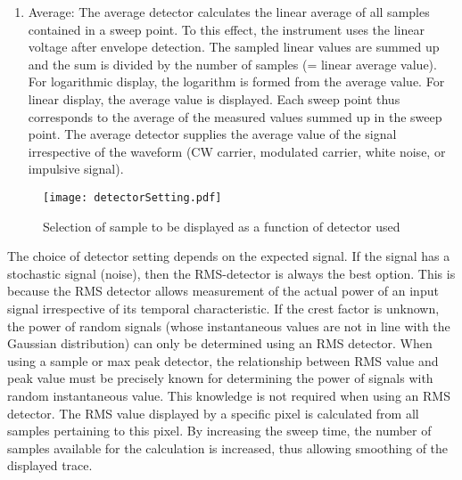 \begin{enumerate}
  \item Average: The average detector calculates the linear average of all samples contained in a sweep point. To this effect, the instrument uses the linear voltage after envelope detection. The sampled linear values are summed up and the sum is divided by the number of samples (= linear average value). For logarithmic display, the logarithm is formed from the average value. For linear display, the average value is displayed. Each sweep point thus corresponds to the average of the measured values summed up in the sweep point. The average detector supplies the average value of the signal irrespective of the waveform (\acs{CW} carrier, modulated carrier, white noise, or impulsive signal). 
  \end{enumerate}
  
\begin{figure}[H]
\centering
\texttt{[image: detectorSetting.pdf]}
\caption{Selection of sample to be displayed as a function of detector used \cite{funsspec}}
\label{fig:detectorSettings}
\end{figure}

The choice of detector setting depends on the expected signal. If the signal has a stochastic signal (noise), then the \acs{RMS}-detector is always the best option. This is because the \acs{RMS} detector allows measurement of the actual power of an input signal irrespective of its temporal characteristic. If the crest factor is unknown, the power of random signals (whose instantaneous values are not in line with the Gaussian distribution) can only be determined using an \acs{RMS} detector. When using a sample or max peak detector, the relationship between \acs{RMS} value and peak value must be precisely known for determining the power of signals with random instantaneous value. This knowledge is not required when using an \acs{RMS} detector. The \acs{RMS} value displayed by a specific pixel is calculated from all samples pertaining to this pixel. By increasing the sweep time, the number of samples available for the calculation is increased, thus allowing smoothing of the displayed trace. 

